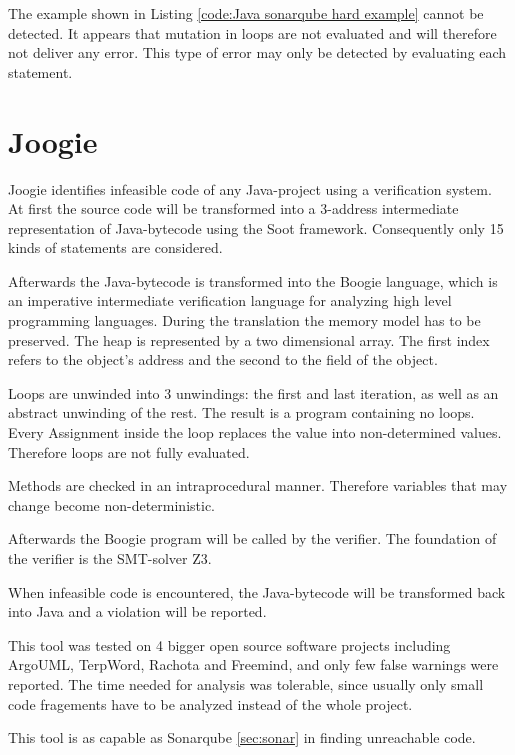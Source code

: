 The example shown in Listing \ref{code:Java sonarqube hard example} cannot be detected. It appears that mutation in loops are not evaluated and will therefore not deliver any error. This type of error may only be detected by evaluating each statement.

\section{Joogie}
\label{sec:sca paper}
Joogie \cite{arltJoogieInfeasibleCode2012, arltJoogieJavaJimple2013} identifies infeasible code of any Java-project using a verification system. 
At first the source code will be transformed into a 3-address intermediate representation of Java-bytecode using the Soot framework. Consequently only 15 kinds of statements are considered. 

Afterwards the Java-bytecode is transformed into the Boogie language, which is an imperative intermediate verification language for analyzing high level programming languages.
During the translation the memory model has to be preserved. The heap is represented by a two dimensional array. The first index refers to the object's address and the second to the field of the object.

Loops are unwinded into 3 unwindings: the first and last iteration, as well as an abstract unwinding of the rest.
The result is a program containing no loops. Every Assignment inside the loop replaces the value into non-determined values. Therefore loops are not fully evaluated.


Methods are checked in an intraprocedural manner. Therefore variables that may change become non-deterministic. 


Afterwards the Boogie program will be called by the verifier. 
The foundation of the verifier is the SMT-solver Z3.



When infeasible code is encountered, the Java-bytecode will be transformed back into Java and a violation will be reported.


This tool was tested on 4 bigger open source software projects including ArgoUML, TerpWord, Rachota and Freemind, and only few false warnings were reported.
The time needed for analysis was tolerable, since usually only small code fragements have to be analyzed instead of the whole project.

This tool is as capable as Sonarqube \ref{sec:sonar} in finding unreachable code.

